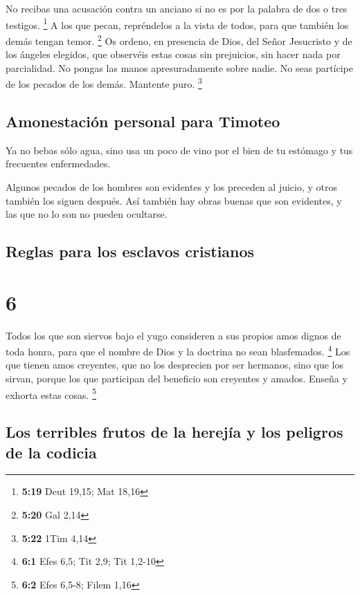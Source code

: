  No recibas una acusación contra un anciano si no es por
la palabra de dos o tres testigos. \footnote{\textbf{5:19} Deut 19,15;
  Mat 18,16}  A los que pecan, repréndelos a la vista de
todos, para que también los demás tengan temor. \footnote{\textbf{5:20}
  Gal 2,14}  Os ordeno, en presencia de Dios, del Señor
Jesucristo y de los ángeles elegidos, que observéis estas cosas sin
prejuicios, sin hacer nada por parcialidad.  No pongas
las manos apresuradamente sobre nadie. No seas partícipe de los pecados
de los demás. Mantente puro. \footnote{\textbf{5:22} 1Tim 4,14}

\hypertarget{amonestaciuxf3n-personal-para-timoteo}{%
\subsection{Amonestación personal para
Timoteo}\label{amonestaciuxf3n-personal-para-timoteo}}

 Ya no bebas sólo agua, sino usa un poco de vino por el
bien de tu estómago y tus frecuentes enfermedades.

 Algunos pecados de los hombres son evidentes y los
preceden al juicio, y otros también los siguen después. 
Así también hay obras buenas que son evidentes, y las que no lo son no
pueden ocultarse.

\hypertarget{reglas-para-los-esclavos-cristianos}{%
\subsection{Reglas para los esclavos
cristianos}\label{reglas-para-los-esclavos-cristianos}}

\hypertarget{section-5}{%
\section{6}\label{section-5}}

 Todos los que son siervos bajo el yugo consideren a sus
propios amos dignos de toda honra, para que el nombre de Dios y la
doctrina no sean blasfemados. \footnote{\textbf{6:1} Efes 6,5; Tit 2,9;
  Tit 1,2-10}  Los que tienen amos creyentes, que no los
desprecien por ser hermanos, sino que los sirvan, porque los que
participan del beneficio son creyentes y amados. Enseña y exhorta estas
cosas. \footnote{\textbf{6:2} Efes 6,5-8; Filem 1,16}

\hypertarget{los-terribles-frutos-de-la-herejuxeda-y-los-peligros-de-la-codicia}{%
\subsection{Los terribles frutos de la herejía y los peligros de la
codicia}\label{los-terribles-frutos-de-la-herejuxeda-y-los-peligros-de-la-codicia}}

